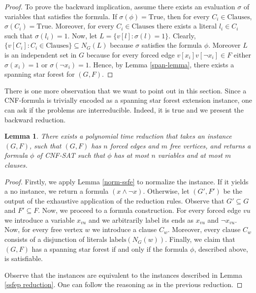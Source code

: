 \documentclass[en]{pracamgr}
\newtheorem{lemma}{Lemma}
\theoremstyle{definition}
\newcommand{\cnfsat}{{\sc CNF-SAT}}
\begin{document}
\begin{proof}
	To prove the backward implication, assume there exists an evaluation $\sigma$ of variables that satisfies the formula. If $\sigma(\phi)=\textrm{True}$, then for every $C_i \in \textrm{Clauses}$, $\sigma(C_i)=\textrm{True}$. Moreover, for every $C_i \in \textrm{Clauses}$ there exists a literal $l_i \in C_i$ such that $\sigma(l_i)=1$. Now, let $L = \{v[l]: \sigma(l)=1\}$. Clearly, $\{v[C_i]: C_i \in \textrm{Clauses}\} \subseteq N_G(L)$ because $\sigma$ satisfies the formula $\phi$. Moreover $L$ is an independent set in $G$ because for every forced edge $v[x_i]v[\neg x_i] \in F$ either $\sigma(x_i)=1$ or $\sigma(\neg x_i)=1$. Hence, by Lemma \ref{span-lemma}, there exists a spanning star forest for $(G,F)$.
\end{proof}

There is one more observation that we want to point out in this section. Since a CNF-formula is trivially encoded as a spanning star forest extension instance, one can ask if the problems are interreducible. Indeed, it is true and we present the backward reduction.

\begin{lemma}\label{cnfsat reduction}
	There exists a polynomial time reduction that takes an instance $(G,F)$, such that $(G,F)$ has $n$ forced edges and $m$ free vertices, and returns a formula $\phi$ of \cnfsat{} such that $\phi$ has at most $n$ variables and at most $m$ clauses.
\end{lemma}

\begin{proof}
	Firstly, we apply Lemma \ref{norm-ssfe} to normalize the instance. If it yields a no instance, we return a formula $(x \land \neg x)$. Otherwise, let $(G',F')$ be the output of the exhaustive application of the reduction rules. Observe that $G' \subseteq G$ and $F' \subseteq F$. Now, we proceed to a formula construction. For every forced edge $vu$ we introduce a variable $x_{vu}$ and we arbitrarily label its ends as $x_{vu}$ and $\neg x_{vu}$. Now, for every free vertex $w$ we introduce a clause $C_w$. Moreover, every clause $C_w$ consists of a disjunction of literals $\textrm{labels}(N_G(w))$. Finally, we claim that $(G,F)$ has a spanning star forest if and only if the formula $\phi$, described above, is satisfiable.
	
	Observe that the instances are equivalent to the instances described in Lemma \ref{ssfep reduction}. One can follow the reasoning as in the previous reduction.
\end{proof}
\end{document}
